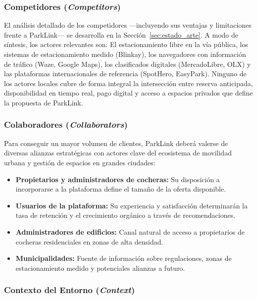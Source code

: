 \subsubsection{Competidores (\textit{Competitors})}

El análisis detallado de los competidores —incluyendo sus ventajas y limitaciones frente a ParkLink— se desarrolla en la Sección~\ref{sec:estado_arte}. A modo de síntesis, los actores relevantes son: El estacionamiento libre en la vía pública, los sistemas de estacionamiento medido (Blinkay), los navegadores con información de tráfico (Waze, Google Maps), los clasificados digitales (MercadoLibre, OLX) y las plataformas internacionales de referencia (SpotHero, EasyPark). Ninguno de los actores locales cubre de forma integral la intersección entre reserva anticipada, disponibilidad en tiempo real, pago digital y acceso a espacios privados que define la propuesta de ParkLink.

\subsubsection{Colaboradores (\textit{Collaborators})}

Para conseguir un mayor volumen de clientes, ParkLink deberá valerse de diversas alianzas estratégicas con actores clave del ecosistema de movilidad urbana y gestión de espacios en grandes ciudades:

\begin{itemize}
    \item \textbf{Propietarios y administradores de cocheras:} Su disposición a incorporarse a la plataforma define el tamaño de la oferta disponible.
    \item \textbf{Usuarios de la plataforma:} Su experiencia y satisfacción determinarán la tasa de retención y el crecimiento orgánico a través de recomendaciones.
    \item \textbf{Administradores de edificios:} Canal natural de acceso a propietarios de cocheras residenciales en zonas de alta densidad.
    \item \textbf{Municipalidades:} Fuente de información sobre regulaciones, zonas de estacionamiento medido y potenciales alianzas a futuro.
\end{itemize}

\subsubsection{Contexto del Entorno (\textit{Context})}

